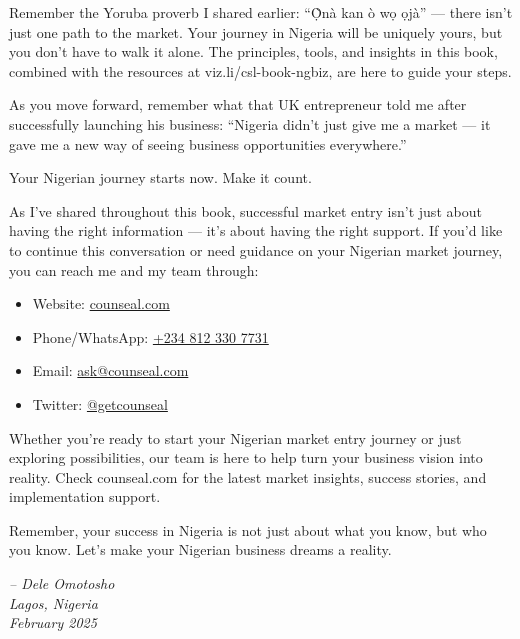 Remember the Yoruba proverb I shared earlier: ``Ọ̀nà kan ò wọ ọjà'' --- there isn't just one path to the market. Your journey in Nigeria will be uniquely yours, but you don't have to walk it alone. The principles, tools, and insights in this book, combined with the resources at viz.li/csl-book-ngbiz, are here to guide your steps.

As you move forward, remember what that UK entrepreneur told me after successfully launching his business: ``Nigeria didn't just give me a market --- it gave me a new way of seeing business opportunities everywhere.''

Your Nigerian journey starts now. Make it count.

As I've shared throughout this book, successful market entry isn't just about having the right information --- it's about having the right support. If you'd like to continue this conversation or need guidance on your Nigerian market journey, you can reach me and my team through:

\begin{itemize}
    \item Website: \href{https://counseal.com}{counseal.com}
    \item Phone/WhatsApp: \href{https://wa.me/2348123307731}{+234 812 330 7731}
    \item Email: \href{mailto:ask@counseal.com?subject=Question%20from%20Book}{ask@counseal.com}
    \item Twitter: \href{https://twitter.com/getcounseal}{@getcounseal}
\end{itemize}

Whether you're ready to start your Nigerian market entry journey or just exploring possibilities, our team is here to help turn your business vision into reality. Check counseal.com for the latest market insights, success stories, and implementation support.

Remember, your success in Nigeria is not just about what you know, but who you know. Let's make your Nigerian business dreams a reality.

\begin{flushright}
\textit{-- Dele Omotosho\\
Lagos, Nigeria\\
February 2025}
\end{flushright}
